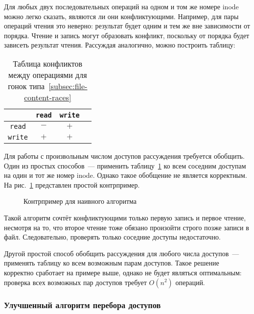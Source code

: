 Для любых двух последовательных операций на одном и том же номере inode можно легко сказать, являются ли они конфликтующими. Например, для пары операций чтения это неверно: результат будет одним и тем же вне зависимости от порядка. Чтение и запись могут образовать конфликт, поскольку от порядка будет зависеть результат чтения. Рассуждая аналогично, можно построить таблицу:

\begin{table}[H]
    \centering
    \begin{tabular}{cccc}
        \toprule
        & \texttt{read} & \texttt{write} \\
        \midrule
        \texttt{read} & $-$ & $+$ \\
        \texttt{write} & $+$ & $+$ \\
        \bottomrule
    \end{tabular}
    \caption{Таблица конфликтов между операциями для гонок типа~\ref{subsec:file-content-races}}
    \label{tab:conflict-table}
\end{table}

Для работы с произвольным числом доступов рассуждения требуется обобщить. Один из простых способов~--- применить таблицу~\ref{tab:conflict-table} ко всем соседним доступам на один и тот же номер inode. Однако такое обобщение не является корректным. На рис.~\ref{fig:naive-conflict-break} представлен простой контрпример.

\begin{figure}[H]
    \centering
    
    \caption{Контрпример для наивного алгоритма}
    \label{fig:naive-conflict-break}
\end{figure}

Такой алгоритм сочтёт конфликтующими только первую запись и первое чтение, несмотря на то, что второе чтение тоже обязано произойти строго позже записи в файл. Следовательно, проверять только соседние доступы недостаточно.

Другой простой способ обобщить рассуждения для любого числа доступов~--- применять таблицу ко всем возможным парам доступов. Такое решение корректно сработает на примере выше, однако не будет являться оптимальным: проверка всех возможных пар доступов требует $O(n^2)$ операций.

\subsubsection{Улучшенный алгоритм перебора доступов}
\label{subsubsec:linear-time-proof}

